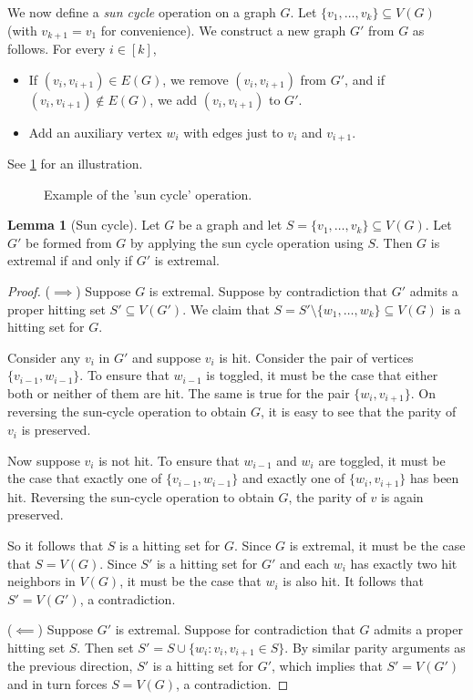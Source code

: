 \documentclass{amsart}
\theoremstyle{definition}
\newtheorem{lemma}[theorem]{Lemma}
\theoremstyle{remark}
\begin{document}
We now define a \textit{sun cycle} operation on a graph $G$. Let $\{v_1,\ldots,v_k\} \subseteq V(G)$ (with $v_{k+1} = v_1$ for convenience). We construct a new graph $G'$ from $G$ as follows. For every $i \in [k]$,
\begin{itemize}
    \item If $(v_i,v_{i+1}) \in E(G)$, we remove $(v_i,v_{i+1})$ from $G'$, and if $(v_i,v_{i+1}) \not\in E(G)$, we add $(v_i,v_{i+1})$ to $G'$.
    \item Add an auxiliary vertex $w_i$ with edges just to $v_i$ and $v_{i+1}$.
\end{itemize}
See \cref{fig: sun} for an illustration.
\begin{figure}[h]
    \centering
    \caption{Example of the 'sun cycle' operation.} %
    \label{fig: sun}
\end{figure}

\begin{lemma}[Sun cycle]\label{lemma:sun}
    Let $G$ be a graph and let $S = \{v_1,\ldots,v_k\} \subseteq V(G)$. Let $G'$ be formed from $G$ by applying the sun cycle operation using $S$. Then $G$ is extremal if and only if $G'$ is extremal.
\end{lemma}
\begin{proof}
    ($\implies$) Suppose $G$ is extremal. Suppose by contradiction that $G'$ admits a proper hitting set $S' \subseteq V(G')$. We claim that $S = S' \setminus \{w_1,\ldots,w_k\} \subseteq V(G)$ is a hitting set for $G$.  
    
    Consider any $v_i$ in $G'$ and suppose $v_i$ is hit. Consider the pair of vertices $\{v_{i-1},w_{i-1}\}$. To ensure that $w_{i-1}$ is toggled, it must be the case that either both or neither of them are hit. The same is true for the pair $\{w_i,v_{i+1}\}$. On reversing the sun-cycle operation to obtain $G$, it is easy to see that the parity of $v_i$ is preserved.
    
    Now suppose $v_i$ is not hit. To ensure that $w_{i-1}$ and $w_i$ are toggled, it must be the case that exactly one of $\{v_{i-1},w_{i-1}\}$ and exactly one of $\{w_i,v_{i+1}\}$ has been hit. Reversing the sun-cycle operation to obtain $G$, the parity of $v$ is again preserved. 
    
    So it follows that $S$ is a hitting set for $G$. Since $G$ is extremal, it must be the case that $S = V(G)$. Since $S'$ is a hitting set for $G'$ and each $w_i$ has exactly two hit neighbors in $V(G)$, it must be the case that $w_i$ is also hit. It follows that $S' = V(G')$, a contradiction.
    
    ($\impliedby$) Suppose $G'$ is extremal. Suppose for contradiction that $G$ admits a proper hitting set $S$. Then set $S' = S \cup \{w_i \colon v_i, v_{i+1} \in S\}$. By similar parity arguments as the previous direction, $S'$ is a hitting set for $G'$, which implies that $S' = V(G')$ and in turn forces $S = V(G)$, a contradiction.
\end{proof}
\end{document}
